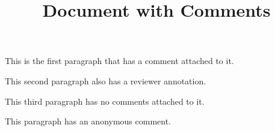\documentclass[11pt,a4paper]{article}
\title{Document with Comments}
\begin{document}
\maketitle

This is the first paragraph that has a comment attached to it.

This second paragraph also has a reviewer annotation.

This third paragraph has no comments attached to it.

This paragraph has an anonymous comment.
\end{document}
